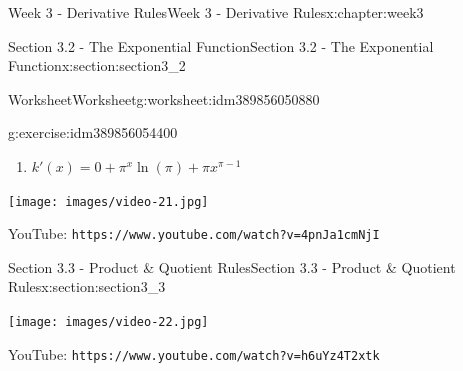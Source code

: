 \documentclass[oneside,10pt,]{book}
\newcommand{\mono}[1]{\texttt{#1}}
\numberwithin{equation}{section}
\newlength{\qrsize}
\newlength{\previewwidth}
\begin{document}
\begin{chapterptx}{Week 3 - Derivative Rules}{}{Week 3 - Derivative Rules}{}{}{x:chapter:week3}
\begin{sectionptx}{Section 3.2 - The Exponential Function}{}{Section 3.2 - The Exponential Function}{}{}{x:section:section3_2}
\begin{worksheet-subsection}{Worksheet}{}{Worksheet}{}{}{g:worksheet:idm389856050880}
\begin{divisionexercise}{1}{}{}{g:exercise:idm389856054400}
\begin{enumerate}[label=(\alph*)]
\item{}\(\displaystyle k'(x) = 0+\pi^x\ln(\pi)+\pi x^{\pi-1}\)%
\end{enumerate}
\end{divisionexercise}%
\end{worksheet-subsection}
\restoregeometry
\setlength{\qrsize}{9em}
\setlength{\previewwidth}{\linewidth}
\addtolength{\previewwidth}{-\qrsize}
\begin{tcbraster}[raster columns=2, raster column skip=1pt, raster halign=center, raster force size=false, raster left skip=0pt, raster right skip=0pt]%
\begin{tcolorbox}[previewstyle, width=\previewwidth]%
\texttt{[image: images/video-21.jpg]}%
\end{tcolorbox}%
\begin{tcolorbox}[qrstyle]%
{\hypersetup{urlcolor=black}}%
\end{tcolorbox}%
\begin{tcolorbox}[captionstyle]%
\small YouTube: \mono{https://www.youtube.com/watch?v=4pnJa1cmNjI}\end{tcolorbox}%
\end{tcbraster}%
\end{sectionptx}
%
%
\typeout{************************************************}
\typeout{************************************************}
%
\begin{sectionptx}{Section 3.3 - Product \& Quotient Rules}{}{Section 3.3 - Product \& Quotient Rules}{}{}{x:section:section3_3}
\setlength{\qrsize}{9em}
\setlength{\previewwidth}{\linewidth}
\addtolength{\previewwidth}{-\qrsize}
\begin{tcbraster}[raster columns=2, raster column skip=1pt, raster halign=center, raster force size=false, raster left skip=0pt, raster right skip=0pt]%
\begin{tcolorbox}[previewstyle, width=\previewwidth]%
\texttt{[image: images/video-22.jpg]}%
\end{tcolorbox}%
\begin{tcolorbox}[qrstyle]%
{\hypersetup{urlcolor=black}}%
\end{tcolorbox}%
\begin{tcolorbox}[captionstyle]%
\small YouTube: \mono{https://www.youtube.com/watch?v=h6uYz4T2xtk}\end{tcolorbox}%
\end{tcbraster}%

\end{sectionptx}
\end{chapterptx}
\end{document}
